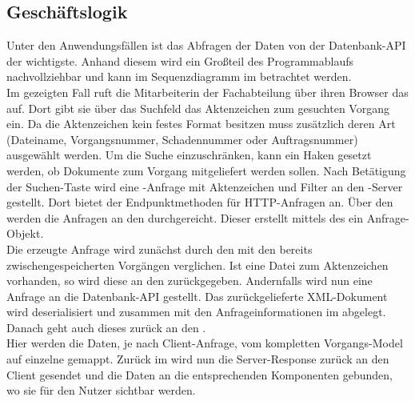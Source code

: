 \subsection{Geschäftslogik}
\label{sec:Geschaeftslogik}
Unter den Anwendungsfällen ist das Abfragen der Daten von der Datenbank-\acs{API} der wichtigste.
Anhand diesem wird ein Großteil des Programmablaufs nachvollziehbar und kann im Sequenzdiagramm
im  betrachtet werden.\\
Im gezeigten Fall ruft die Mitarbeiterin der Fachabteilung über ihren Browser das  auf.
Dort gibt sie über das Suchfeld das Aktenzeichen zum gesuchten Vorgang ein. Da die Aktenzeichen kein festes 
Format besitzen muss zusätzlich deren Art (Dateiname, Vorgangsnummer, Schadennummer oder Auftragsnummer)
ausgewählt werden. Um die Suche einzuschränken, kann ein Haken gesetzt werden, ob Dokumente zum Vorgang mitgeliefert werden sollen.
Nach Betätigung der Suchen-Taste wird eine -Anfrage mit Aktenzeichen und Filter an den 
-Server gestellt. Dort bietet der  Endpunktmethoden für \acs{HTTP}-Anfragen an.
Über den  werden die Anfragen an den  durchgereicht.
Dieser erstellt mittels des  ein Anfrage-Objekt.\\
Die erzeugte Anfrage wird zunächst durch den  mit den bereits zwischengespeicherten
Vorgängen verglichen. Ist eine Datei zum Aktenzeichen vorhanden, so wird diese an den  
zurückgegeben. Andernfalls wird nun eine Anfrage an die Datenbank-API gestellt.
Das zurückgelieferte XML-Dokument wird deserialisiert und zusammen mit den Anfrageinformationen im  abgelegt.
Danach geht auch dieses zurück an den .\\
Hier werden die Daten, je nach Client-Anfrage, vom kompletten Vorgangs-Model auf einzelne  gemappt.
Zurück im  wird nun die Server-Response zurück an den Client gesendet und die Daten
an die entsprechenden Komponenten gebunden, wo sie für den Nutzer sichtbar werden.

